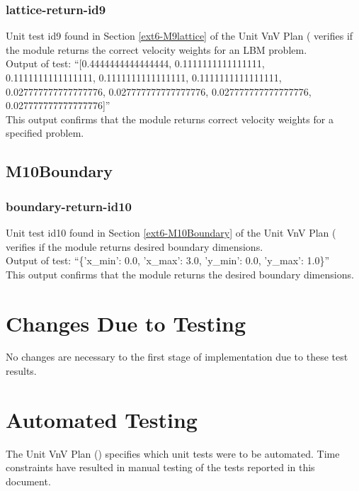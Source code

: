 \documentclass[12pt, titlepage]{article}
\begin{document}
\subsubsection{lattice-return-id9}

Unit test id9 found in Section \ref{ext6-M9lattice} of the Unit VnV Plan (\citet{LBM_UVNV_PM} verifies if the module returns the correct velocity weights for an LBM problem.\\

\noindent Output of test: ``[0.4444444444444444, 0.1111111111111111,
\\0.1111111111111111, 0.1111111111111111, 0.1111111111111111,
\\0.027777777777777776, 0.027777777777777776, 0.027777777777777776,
\\0.027777777777777776]''\\

\noindent This output confirms that the module returns correct velocity weights for a specified problem.

\subsection{M10Boundary}
\subsubsection{boundary-return-id10}

Unit test id10 found in Section \ref{ext6-M10Boundary} of the Unit VnV Plan (\citet{LBM_UVNV_PM} verifies if the module returns desired boundary dimensions.\\

\noindent Output of test: ``\{’x\_min’: 0.0, ’x\_max’: 3.0, ’y\_min’: 0.0, ’y\_max’: 1.0\}''\\

\noindent This output confirms that the module returns the desired boundary dimensions.

\section{Changes Due to Testing}
No changes are necessary to the first stage of implementation due to these test results.

\section{Automated Testing}

The Unit VnV Plan (\citet{LBM_UVNV_PM}) specifies which unit tests were to be automated. Time constraints have resulted in manual testing of the tests reported in this document.
\end{document}
